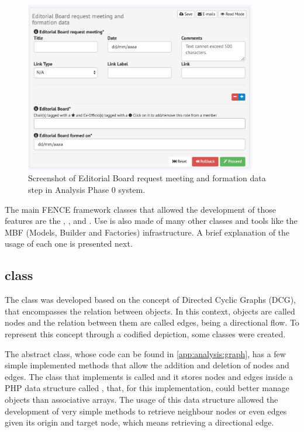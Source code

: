 \begin{figure}[htb]
  \centering
  \includegraphics[width=0.9\textwidth]{figures/editorial_board_step.png}
  \caption{Screenshot of Editorial Board request meeting and formation data step in Analysis Phase 0 system.}%
  \label{fig:editorial_board_step}
\end{figure}

The main FENCE framework classes that allowed the development of those features are the , ,  and .
Use is also made of many other classes and tools like the MBF (Models, Builder and Factories) infrastructure.
A brief explanation of the usage of each one is presented next.

\subsection{ class}%
\label{sec:Workflow_class}

The  class was developed based on the concept of Directed Cyclic Graphs (DCG), that encompasses the relation between objects. In this context, objects are called nodes and the relation between them are called edges, being a directional flow. To represent this concept through a codified depiction, some classes were created.

The abstract  class, whose code can be found in \cref{app:analysis:graph}, has a few simple implemented methods that allow the addition and deletion of nodes and edges.
The class that implements  is called  and it stores nodes and edges inside a PHP data structure called , that, for this implementation, could better manage objects than associative arrays.
The usage of this data structure allowed the development of very simple methods to retrieve neighbour nodes or even edges given its origin and target node, which means retrieving a directional edge.

